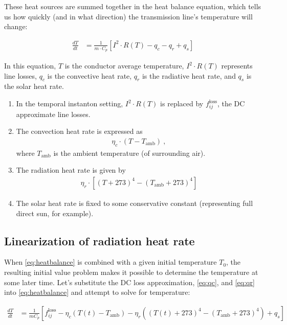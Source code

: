 \documentclass{article}
\begin{document}
    These heat sources are summed together in the heat balance equation,
which tells us how quickly (and in what direction) the transmission
line's temperature will change:

\begin{align}\label{eq:heatbalance}
\frac{dT}{dt} &= \frac{1}{m\cdot C_p}\left[I^2\cdot R(T) - q_c - q_r + q_s \right]
\end{align}

In this equation, $T$ is the conductor average temperature, $I^2\cdot R(T)$ represents line losses, $q_c$ is the convective heat rate, $q_r$ is the radiative heat rate, and $q_s$ is the solar heat rate.

\begin{enumerate}
\item
  In the temporal instanton setting, $I^2\cdot R(T)$ is replaced by
  $f_{ij}^\text{loss}$, the DC approximate line losses.
\item
  The convection heat rate is expressed as
  \begin{align}\label{eq:qc}
  \eta_c\cdot(T - T_\text{amb})~,
  \end{align}
  where $T_\text{amb}$ is the ambient temperature (of surrounding air).
\item
  The radiation heat rate is given by
  \begin{align}\label{eq:qr}
    \eta_r\cdot\left[(T + 273)^4 - (T_\text{amb} + 273)^4\right]
  \end{align}
\item
  The solar heat rate is fixed to some conservative constant (representing full direct sun, for example).
\end{enumerate}

\subsection{Linearization of radiation heat rate}

    When \eqref{eq:heatbalance} is combined with a given initial temperature $T_0$, the
resulting initial value problem makes it possible to determine the temperature at some later time. Let's substitute the DC loss approximation, \eqref{eq:qc}, and \eqref{eq:qr} into \eqref{eq:heatbalance} and attempt to solve for temperature:

\begin{align}
\frac{dT}{dt} &= \frac{1}{mC_p}\left[ f_{ij}^\text{loss} - \eta_c\left( T(t) - T_\text{amb}\right) - \eta_r\left((T(t) + 273)^4 - (T_\text{amb} + 273)^4\right) + q_s \right]
\end{align}
\end{document}
